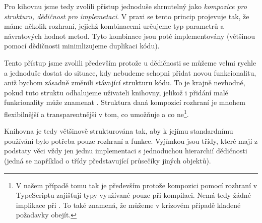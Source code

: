 Pro kihovnu jsme tedy zvolili přístup jednoduše shrnutelný jako \textit{kompozice pro strukturu, dědičnost pro implemetaci}.
V praxi se tento princip projevuje tak, že máme několik rozhraní, jejichž kombinacemi určujeme typ parametrů a návratových hodnot metod.
Tyto kombinace jsou poté implementovány (většinou pomocí dědičnosti minimlizujeme duplikaci kódu).

Tento přístup jsme zvolili především protože u dědičnosti se můžeme velmi rychle a jednoduše dostat do situace, kdy nebudeme schopni přidat novou funkcionalitu, aniž bychom zásadně změnili stávající strukturu kódu.
To je krajně nevhodné, pokud tuto struktu odhalujeme uživateli knihovny, jelikož i přidání malé funkcionality může znamenat .
Struktura daná kompozicí rozhraní je mnohem flexibilnější a transparentnější v tom, co umožňuje a co ne\footnote{V našem případě tomu tak je především protože kompozici pomocí rozhraní v TypeScriptu zajišťují typy využívané pouze při kompilaci. Nemá tedy žádné implikace při . To také znamená, že můžeme v krizovém případě kladené požadavky obejít.}.

Knihovna je tedy většinově strukturována tak, aby k jejímu standardnímu používání bylo potřeba  pouze rozhraní a funkce.
Vyjímkou jsou třídy, které mají z podstaty věci vždy jen jednu implementaci s jednoduchou hierarchií dědičnosti (jedná se například o třídy představující průsečíky jiných objektů).
